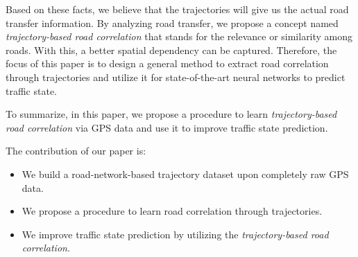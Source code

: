 Based on these facts, we believe that the trajectories will give us the actual road transfer information. By analyzing road transfer, we propose a concept named \textit{trajectory-based road correlation} that stands for the relevance or similarity among roads. With this, a better spatial dependency can be captured. Therefore, the focus of this paper is to design a general method to extract road correlation through trajectories and utilize it for state-of-the-art neural networks to predict traffic state.

To summarize, in this paper, we propose a procedure to learn \textit{trajectory-based road correlation} via GPS data and use it to improve traffic state prediction.

The contribution of our paper is:
\begin{itemize}
    \item We build a road-network-based trajectory dataset upon completely raw GPS data.
    \item We propose a procedure to learn road correlation through trajectories.
    \item We improve traffic state prediction by utilizing the \textit{trajectory-based road correlation}.
\end{itemize}
